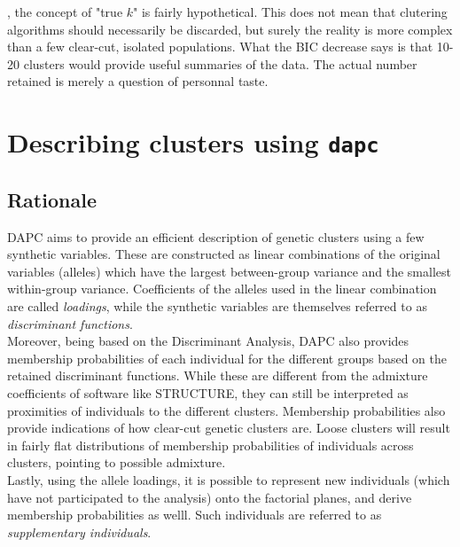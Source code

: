 \documentclass{article}
\newcommand{\code}[1]{{{\tt #1}}}
\begin{document}
\noindent , the concept of "true $k$" is fairly hypothetical. This does not mean that clutering
algorithms should necessarily be discarded, but surely the reality is more complex than a few
clear-cut, isolated populations. What the BIC decrease says is that 10-20 clusters would provide useful
summaries of the data. The actual number retained is merely a question of personnal taste.









\section{Describing clusters using \code{dapc}}


\subsection{Rationale}
DAPC aims to provide an efficient description of genetic clusters using a few synthetic variables.
These are constructed as linear combinations of the original variables (alleles) which have the
largest between-group variance and the smallest within-group variance. Coefficients of the alleles
used in the linear combination are called \textit{loadings}, while the synthetic variables are
themselves referred to as \textit{discriminant functions}.
\\

Moreover, being based on the Discriminant Analysis, DAPC also provides membership probabilities of
each individual for the different groups based on the retained discriminant functions. While these
are different from the admixture coefficients of software like STRUCTURE, they can still be
interpreted as proximities of individuals to the different clusters. Membership
probabilities also provide indications of how clear-cut genetic clusters are. Loose clusters will
result in fairly flat distributions of membership probabilities of individuals across clusters,
pointing to possible admixture.
\\

Lastly, using the allele loadings, it is possible to represent new individuals (which have not participated to the analysis)
onto the factorial planes, and derive membership probabilities as welll. Such individuals are
referred to as \textit{supplementary individuals}.
\end{document}
